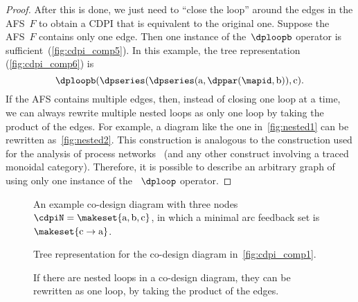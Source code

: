 \begin{proof}
    After this is done, we just need to ``close the loop'' around the edges in the AFS~$F$ to obtain a CDPI that is equivalent to the original one.
    Suppose the AFS~$F$ contains only one edge.
    Then one instance of the~$\dploopb$ operator is sufficient~(\cref{fig:cdpi_comp5}).
    In this example, the tree representation (\cref{fig:cdpi_comp6}) is
    \begin{equation}
        \dploopb(\dpseries(\dpseries(\text{a},\dppar(\mapid,\text{b})),\text{c}).
    \end{equation}
    If the AFS contains multiple edges, then, instead of closing one loop at a time, we can always rewrite multiple nested loops as only one loop by taking the product of the edges.
    For example, a diagram like the one in~\cref{fig:nested1} can be rewritten as~\cref{fig:nested2}.
    This construction is analogous to the construction used for the analysis of process networks~\cite{lee10} (and any other construct involving a traced monoidal category).
    Therefore, it is possible to describe an arbitrary graph of  using only one instance of the ~$\dploop$ operator.
\end{proof}

\begin{figure}[tbh]
    \hfill{}
    \hfill{}

    \caption{An example co-design diagram with three nodes~$\cdpiN=\makeset{\text{a},\text{b},\text{c}}$,
        in which a minimal arc feedback set is $\makeset{\text{c}\rightarrow\text{a}}$.
    }
\end{figure}

\begin{figure}
    \hfill{}
    \hfill{}
    \hfill{}

    \caption{Tree representation for the co-design diagram in~\cref{fig:cdpi_comp1}.}
\end{figure}

\begin{figure}[h]
    \caption{If there are nested loops in a co-design diagram, they can be rewritten as one loop, by taking the product of the edges.}
    \label{fig:If-there-are}
\end{figure}
